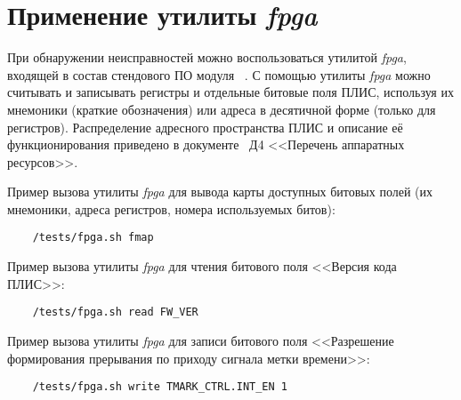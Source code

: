   \section{Применение утилиты \emph{fpga} } %
  \label{sec:fpga_utility_usage}
   
    \subpoint При обнаружении неисправностей можно воспользоваться утилитой \emph{fpga}, входящей в состав стендового ПО модуля \DocProductShortTitle~.
    \subpoint С помощью утилиты \emph{fpga} можно считывать и записывать регистры и отдельные битовые поля ПЛИС, 
    используя их мнемоники (краткие обозначения) или адреса в десятичной форме (только для регистров).
    \subpoint Распределение адресного пространства ПЛИС и описание её функционирования приведено в документе \DocProductSignature~Д4 <<Перечень аппаратных ресурсов>>.
  
    
	    
    \subpoint Пример вызова утилиты \emph{fpga} для вывода карты доступных битовых полей (их мнемоники, адреса регистров, номера используемых битов):
      \begin{lstlisting}
	/tests/fpga.sh fmap
      \end{lstlisting}
    
    \subpoint Пример вызова утилиты \emph{fpga} для чтения битового поля <<Версия кода ПЛИС>>:
      \begin{lstlisting}
	/tests/fpga.sh read FW_VER
      \end{lstlisting}
      
    \subpoint Пример вызова утилиты \emph{fpga} для записи битового поля <<Разрешение формирования прерывания по приходу сигнала метки времени>>:
      \begin{lstlisting}
	/tests/fpga.sh write TMARK_CTRL.INT_EN 1
      \end{lstlisting}